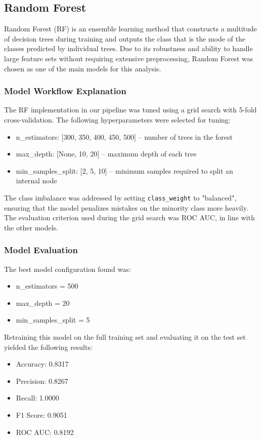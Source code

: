 \documentclass{article}
\begin{document}
\subsection{Random Forest}

Random Forest (RF) is an ensemble learning method that constructs a multitude of decision trees during training and outputs the class that is the mode of the classes predicted by individual trees. Due to its robustness and ability to handle large feature sets without requiring extensive preprocessing, Random Forest was chosen as one of the main models for this analysis.

\subsubsection{Model Workflow Explanation}

The RF implementation in our pipeline was tuned using a grid search with 5-fold cross-validation. The following hyperparameters were selected for tuning:

\begin{itemize}
  \item n\_estimators: [300, 350, 400, 450, 500] -- number of trees in the forest
  \item max\_depth: [None, 10, 20] -- maximum depth of each tree
  \item min\_samples\_split: [2, 5, 10] -- minimum samples required to split an internal node
\end{itemize}

The class imbalance was addressed by setting \texttt{class\_weight} to "balanced", ensuring that the model penalizes mistakes on the minority class more heavily. The evaluation criterion used during the grid search was ROC AUC, in line with the other models.

\subsubsection{Model Evaluation}

The best model configuration found was:
\begin{itemize}
    \item n\_estimators = 500
    \item max\_depth = 20
    \item min\_samples\_split = 5
\end{itemize}

Retraining this model on the full training set and evaluating it on the test set yielded the following results:
\begin{itemize}
  \item Accuracy: 0.8317
  \item Precision: 0.8267
  \item Recall: 1.0000
  \item F1 Score: 0.9051
  \item ROC AUC: 0.8192
\end{itemize}
\end{document}
